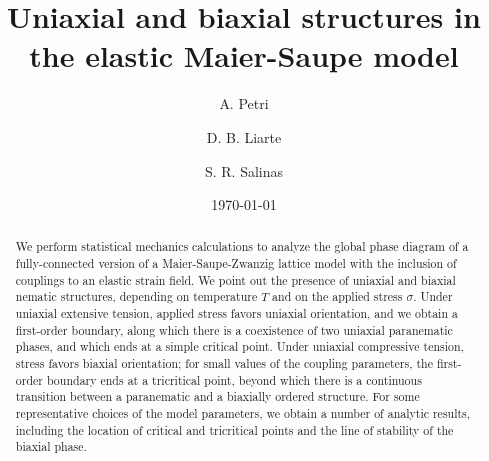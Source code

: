 \documentclass[aps,pre,reprint,amsmath,amssymbols,superscriptaddress,
nofootinbib]{revtex4-1}
\begin{document}

\title{Uniaxial and biaxial structures in the elastic Maier-Saupe model}

\author{A. Petri}
\author{D. B. Liarte}
\author{S. R. Salinas}




\date{\today}

\begin{abstract}
We perform statistical mechanics calculations to analyze the global phase
diagram of a fully-connected version of a Maier-Saupe-Zwanzig lattice model
with the inclusion of couplings to an elastic strain field. We point out the
presence of uniaxial and biaxial nematic structures, depending on temperature
$T$ and on the applied stress $\sigma$. Under uniaxial extensive tension,
applied stress favors uniaxial orientation, and we obtain a first-order
boundary, along which there is a coexistence of two uniaxial paranematic
phases, and which ends at a simple critical point. Under uniaxial compressive
tension, stress favors biaxial orientation; for small values of the coupling
parameters, the first-order boundary ends at a tricritical point, beyond which
there is a continuous transition between a paranematic and a biaxially ordered
structure. For some representative choices of the model parameters, we obtain
a number of analytic results, including the location of critical and
tricritical points and the line of stability of the biaxial phase.
\end{abstract}
\end{document}
